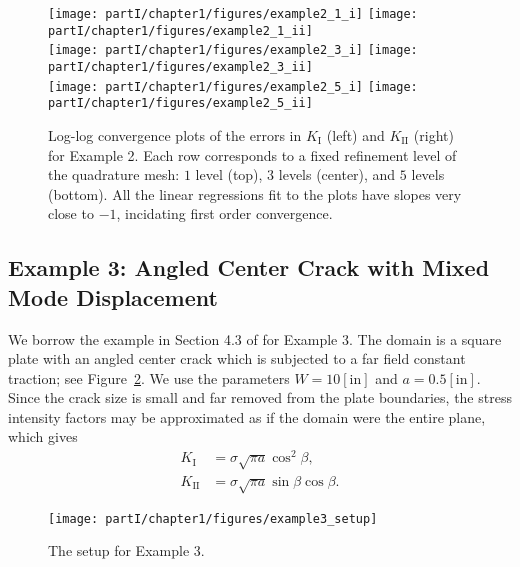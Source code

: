 \setlength{\figurewidth}{0.49\textwidth}
\begin{figure}[htbp]
\centering
\texttt{[image: partI/chapter1/figures/example2\_1\_i]}
\texttt{[image: partI/chapter1/figures/example2\_1\_ii]} \\
\texttt{[image: partI/chapter1/figures/example2\_3\_i]}
\texttt{[image: partI/chapter1/figures/example2\_3\_ii]} \\
\texttt{[image: partI/chapter1/figures/example2\_5\_i]}
\texttt{[image: partI/chapter1/figures/example2\_5\_ii]}
\caption{Log-log convergence plots of the errors in $K_{\text{I}}$ (left) and $K_{\text{II}}$ (right) for Example 2. Each row corresponds to a fixed refinement level of the quadrature mesh: $1$ level (top), $3$ levels (center), and $5$ levels (bottom). All the linear regressions fit to the plots have slopes very close to $-1$, incidating first order convergence.}
\label{fig:chap1.example2.convergence}
\end{figure}

\subsection{Example 3: Angled Center Crack with Mixed Mode Displacement}

We borrow the example in Section 4.3 of \cite{Moes99} for Example 3. The domain is a square plate with an angled center crack which is subjected to a far field constant traction; see Figure~\ref{fig:chap1.example3.setup}. We use the parameters $W = 10 [\text{in}]$ and $a = 0.5 [\text{in}]$. Since the crack size is small and far removed from the plate boundaries, the stress intensity factors may be approximated as if the domain were the entire plane, which gives
\begin{subequations} \label{eq:chap1.example3.K}
\begin{align}
K_{\text{I}} & = \sigma  \sqrt{\pi a} \cos^2 \beta, \\
K_{\text{II}} & = \sigma \sqrt{\pi a} \sin \beta \cos \beta.
\end{align}
\end{subequations}

\setlength{\figurewidth}{0.20\textwidth}
\begin{figure}[htbp]
\centering
\texttt{[image: partI/chapter1/figures/example3\_setup]}
\caption{The setup for Example 3.}
\label{fig:chap1.example3.setup}
\end{figure}

